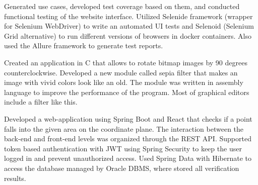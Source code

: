 
\begin{cvHeadingList}


  \begin{cvList}
    \cvItem Generated use cases, developed test coverage based on
      them, and conducted functional testing of the website interface.
    \cvItem Utilized Selenide framework (wrapper for Selenium
      WebDriver) to write an automated UI tests and Selenoid (Selenium
      Grid alternative) to run different versions of browsers in
      docker containers. Also used the Allure framework to generate
      test reports.
  \end{cvList}


  \begin{cvList}
    \cvItem Created an application in C that allows to rotate bitmap
      images by 90 degrees counterclockwise.
    \cvItem Developed a new module called sepia filter that makes an
      image with vivid colors look like an old. The module was written
      in assembly language to improve the performance of the program.
      Most of graphical editors include a filter like this.
  \end{cvList}


  \begin{cvList}
    \cvItem Developed a web-application using Spring Boot and React
      that checks if a point falls into the given area on the
      coordinate plane. The interaction between the back-end and
      front-end levels was organized through the REST API.
    \cvItem Supported token based authentication with JWT using Spring
      Security to keep the user logged in and prevent unauthorized
      access.
    \cvItem Used Spring Data with Hibernate to access the database
      managed by Oracle DBMS, where stored all verification results.
  \end{cvList}



\end{cvHeadingList}
